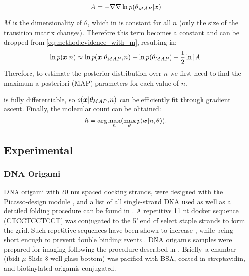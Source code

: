   \begin{equation*}
    A = -\nabla \nabla \ln p(\theta_{MAP} | \bm{x})
  \end{equation*}

  $M$ is the dimensionality of $\theta$, which in \ours is constant for all $n$ (only the size of the transition matrix changes).
  Therefore this term becomes a constant and can be dropped from \eqref{eq:method:evidence_with_m}, resulting in:
  \begin{equation}
    \ln p(\bm{x} | n) \approx \ln p(\bm{x} | \theta_{MAP}, n) + \ln p(\theta_{MAP}) - \frac{1}{2} \ln |A|
    \label{eq:method:evidence}
  \end{equation}
  Therefore, to estimate the posterior distribution over $n$ we first need to 
  find the maximum a posteriori (MAP) parameters for each value of $n$. 

  \ours is fully differentiable, so $p(\bm{x} | \theta_{MAP}, n)$ can be efficiently 
  fit through gradient ascent.
  Finally, the molecular count can be obtained:
  \begin{equation}
      \hat{n} =
      \text{arg}\max_{n}(
      \max_\theta
      p(\bm{x}|n,\theta))
    \text{.}
    \label{eq:method:optimization}
  \end{equation}

\subsection{Experimental}
\subsubsection{DNA Origami}
DNA origami with 20 nm spaced docking strands, were designed with the Picasso-design module \cite{schnitzbauer_2017}, 
  and a list of all single-strand DNA used as well as a detailed folding procedure can be found in \cite{schnitzbauer_2017}.
  A repetitive 11 nt docker sequence (CTCCTCCTCCT) was conjugated to the 5' end of select staple strands to form the grid.
  Such repetitive sequences have been shown to increase \pon, while being short enough to prevent double binding events \cite{civitci_2020}.
  DNA origamis samples were prepared for imaging following the procedure described in \cite{schnitzbauer_2017}. 
  Briefly, a chamber (ibidi $\mu$-Slide 8-well glass bottom) was pacified with BSA, coated in streptavidin, and biotinylated origamis conjugated. 

